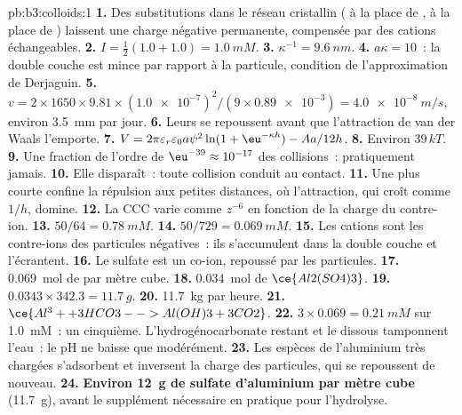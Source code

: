 \begin{solution}{pb:b3:colloids:1}
\textbf{1.} Des substitutions dans le réseau cristallin ( à
la place de ,  à la place de )
laissent une charge négative permanente, compensée par des cations
échangeables.
\textbf{2.} $I = \frac12(1.0 + 1.0) = \qty{1.0}{mM}$.
\textbf{3.} $\kappa^{-1} = \qty{9.6}{nm}$.
\textbf{4.} $a\kappa = 10$~: la double couche est mince par rapport à la
particule, condition de l'approximation de Derjaguin.
\textbf{5.} $v = 2 \times 1650 \times 9.81 \times (\num{1.0e-7})^2/(9 \times \num{0.89e-3}) = \qty{4.0e-8}{m/s}$,
environ \qty{3.5}{mm} par jour.
\textbf{6.} Leurs  se repoussent avant que l'attraction
de van der Waals l'emporte.
\textbf{7.} $V = 2\pi\varepsilon_r\varepsilon_0a\psi^2\ln(1 + \eu^{-\kappa h}) - Aa/12h$.
\textbf{8.} Environ $39\,kT$.
\textbf{9.} Une fraction de l'ordre de $\eu^{-39} \approx 10^{-17}$ des
collisions~: pratiquement jamais.
\textbf{10.} Elle disparaît~: toute collision conduit au contact.
\textbf{11.} Une  plus courte confine la répulsion aux
petites distances, où l'attraction, qui croît comme $1/h$, domine.
\textbf{12.} La CCC varie comme $z^{-6}$ en fonction de la charge du
contre-ion.
\textbf{13.} $50/64 = \qty{0.78}{mM}$.
\textbf{14.} $50/729 = \qty{0.069}{mM}$.
\textbf{15.} Les cations sont les contre-ions des particules négatives~:
ils s'accumulent dans la double couche et l'écrantent.
\textbf{16.} Le sulfate est un co-ion, repoussé par les particules.
\textbf{17.} \qty{0.069}{mol} de  par mètre cube.
\textbf{18.} \qty{0.034}{mol} de $\ce{Al2(SO4)3}$.
\textbf{19.} $0.0343 \times 342.3 = \qty{11.7}{g}$.
\textbf{20.} \qty{11.7}{kg} par heure.
\textbf{21.} $\ce{Al^3+ + 3 HCO3- -> Al(OH)3 + 3 CO2}$.
\textbf{22.} $3 \times 0.069 = \qty{0.21}{mM}$ sur \qty{1.0}{mM}~: un
cinquième. L'hydrogénocarbonate restant et le  dissous tamponnent
l'eau~: le pH ne baisse que modérément.
\textbf{23.} Les espèces de l'aluminium très chargées s'adsorbent et
inversent la charge des particules, qui se repoussent de nouveau.
\textbf{24.} \textbf{Environ \qty{12}{g} de sulfate d'aluminium par mètre
cube} (\qty{11.7}{g}), avant le supplément nécessaire en pratique pour
l'hydrolyse.
\end{solution}

